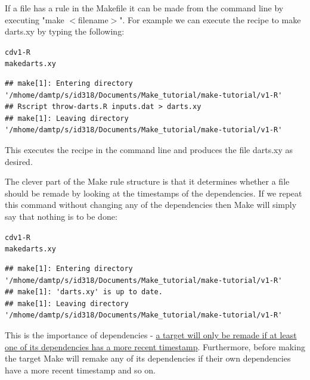 \documentclass[12pt]{article}\usepackage[]{graphicx}\usepackage[]{color}
\makeatletter
\newenvironment{kframe}{%
 \def\at@end@of@kframe{}%
 \ifinner\ifhmode%
  \def\at@end@of@kframe{\end{minipage}}%
  \begin{minipage}{\columnwidth}%
 \fi\fi%
 \def\FrameCommand##1{\hskip\@totalleftmargin \hskip-\fboxsep
 \colorbox{shadecolor}{##1}\hskip-\fboxsep
     \hskip-\linewidth \hskip-\@totalleftmargin \hskip\columnwidth}%
 \MakeFramed {\advance\hsize-\width
   \@totalleftmargin\z@ \linewidth\hsize
   \@setminipage}}%
 {\par\unskip\endMakeFramed%
 \at@end@of@kframe}
\newenvironment{knitrout}{}{} %
\makeatother
\begin{document}
If a file has a rule in the Makefile it can be made from the command line by executing "make $<$filename$>$". For example we can execute the recipe to make darts.xy by typing the following:

\begin{knitrout}
\color{fgcolor}\begin{kframe}
\begin{alltt}
cd v1-R
make darts.xy
\end{alltt}

\begin{verbatim}
## make[1]: Entering directory '/mhome/damtp/s/id318/Documents/Make_tutorial/make-tutorial/v1-R'
## Rscript throw-darts.R inputs.dat > darts.xy
## make[1]: Leaving directory '/mhome/damtp/s/id318/Documents/Make_tutorial/make-tutorial/v1-R'
\end{verbatim}
\end{kframe}
\end{knitrout}

This executes the recipe in the command line and produces the file darts.xy as desired. 

The clever part of the Make rule structure is that it determines whether a file should be remade by looking at the timestamps of the dependencies. If we repeat this command without changing any of the dependencies then Make will simply say that nothing is to be done:

\begin{knitrout}
\color{fgcolor}\begin{kframe}
\begin{alltt}
cd v1-R
make darts.xy
\end{alltt}

\begin{verbatim}
## make[1]: Entering directory '/mhome/damtp/s/id318/Documents/Make_tutorial/make-tutorial/v1-R'
## make[1]: 'darts.xy' is up to date.
## make[1]: Leaving directory '/mhome/damtp/s/id318/Documents/Make_tutorial/make-tutorial/v1-R'
\end{verbatim}
\end{kframe}
\end{knitrout}

This is the importance of dependencies - \underline{a target will only be remade if at least one of its dependencies has a more recent timestamp}. Furthermore, before making the target Make will remake any of its dependencies if their own dependencies have a more recent timestamp and so on.
\end{document}
